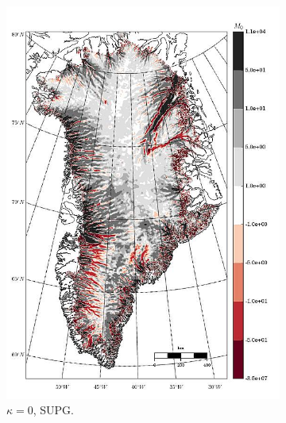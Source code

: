 \begin{figure}
\begin{subfigure}[b]{0.25\linewidth}
    \includegraphics[width=\linewidth]{images/balance_velocity/greenland/misfit_5H_kappa_0_SUPG.jpg}
  \caption{$\kappa = 0$, SUPG.}
  \label{greenland_bv_image_kappa_0_SUPG_misfit}
  \end{subfigure}
  \begin{subfigure}[b]{0.25\linewidth}

\end{subfigure}
\end{figure}
